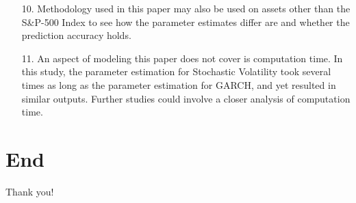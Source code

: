 \documentclass[11pt]{beamer}
\begin{document}
\begin{frame}
\begin{enumerate}
\item[10.] Methodology used in this paper may also be used on assets other than the S\&P-500 Index to see how the parameter estimates differ are and whether the prediction accuracy holds.
\item[11.] An aspect of modeling this paper does not cover is computation time. In this study, the parameter estimation for Stochastic Volatility took several times as long as the parameter estimation for GARCH, and yet resulted in similar outputs. Further studies could involve a closer analysis of computation time.
\end{enumerate} 

\end{frame}

\section{End}
\begin{frame}{Thank you!}

\end{frame}
\end{document}
